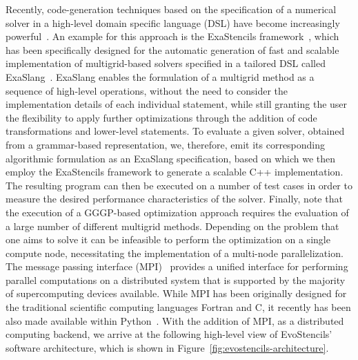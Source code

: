 Recently, code-generation techniques based on the specification of a numerical solver in a high-level domain specific language (DSL) have become increasingly powerful~\cite{kostler2020code}.
An example for this approach is the ExaStencils framework~\cite{lengauer2020exastencils,lengauer2014exastencils}, which has been specifically designed for the automatic generation of fast and scalable implementation of multigrid-based solvers specified in a tailored DSL called ExaSlang~\cite{schmitt2014exaslang,schmitt2016systems,kuckuk2016automatic}.
ExaSlang enables the formulation of a multigrid method as a sequence of high-level operations, without the need to consider the implementation details of each individual statement, while still granting the user the flexibility to apply further optimizations through the addition of code transformations and lower-level statements.
To evaluate a given solver, obtained from a grammar-based representation, we, therefore, emit its corresponding algorithmic formulation as an ExaSlang specification, based on which we then employ the ExaStencils framework to generate a scalable C++ implementation.
The resulting program can then be executed on a number of test cases in order to measure the desired performance characteristics of the solver.
Finally, note that the execution of a GGGP-based optimization approach requires the evaluation of a large number of different multigrid methods.
Depending on the problem that one aims to solve it can be infeasible to perform the optimization on a single compute node, necessitating the implementation of a multi-node parallelization.
The message passing interface (MPI)~\cite{walker1996mpi} provides a unified interface for performing parallel computations on a distributed system that is supported by the majority of supercomputing devices available.
While MPI has been originally designed for the traditional scientific computing languages Fortran and C, it recently has been also made available within Python~\cite{dalcin2021mpi4py}. 
With the addition of MPI, as a distributed computing backend, we arrive at the following high-level view of EvoStencils' software architecture, which is shown in Figure~\ref{fig:evostencils-architecture}.
